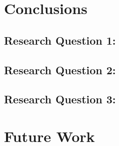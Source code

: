 \section{Conclusions}
\subsection{Research Question 1:}
\subsection{Research Question 2:}
\subsection{Research Question 3:}
\section{Future Work}
